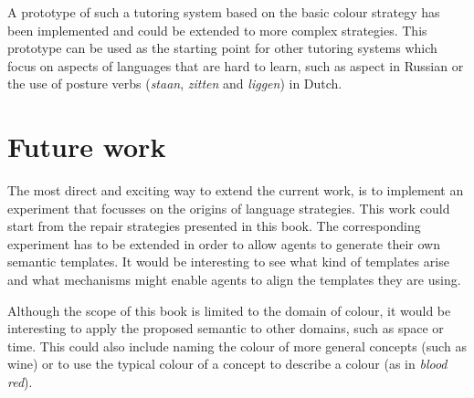 A prototype of such a tutoring system based on the basic colour
  strategy has been implemented and could be extended to more complex
strategies. This prototype can be used as the starting point for  other tutoring
systems which focus on aspects of languages that are hard to learn,
such as aspect in Russian or the use of posture verbs (\textit{staan}, \textit{zitten} and
\textit{liggen}) in Dutch.

\section{Future work}
\label{s:future-work}

The most direct and exciting way to extend the current work, is to
implement an experiment that focusses on the origins of language
strategies. This work could start from the repair strategies presented
in this book. The corresponding experiment has to be extended
in order to allow agents to generate their own semantic templates. 
It would be interesting to
see what kind of templates arise and what mechanisms might enable
agents to align the templates they are using.

Although the scope of this book is limited to the domain of colour,
it would be interesting to apply the proposed semantic to other
domains, such as space or time. This could also include naming the
colour of more general concepts (such as wine) or to use the typical
colour of a concept to describe a colour (as in \textit{blood red}).
